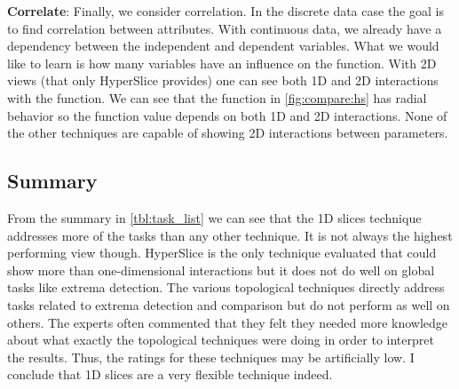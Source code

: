 
\textbf{Correlate}:\label{correlate}
Finally, we consider correlation. In the discrete data case the goal is to find
correlation between attributes. With continuous data, we already have a
dependency between the independent and dependent variables. What we would like
to learn is how many variables have an influence on the function. With 2D views
(that only HyperSlice provides) one can see both 1D and 2D interactions with
the function. We can see that the function in \autoref{fig:compare:hs} has
radial behavior so the function value depends on both 1D and 2D interactions.
None of the other techniques are capable of showing 2D interactions between
parameters.

\subsection{Summary}

From the summary in \autoref{tbl:task_list} we can see that the 1D slices
technique addresses more of the tasks than any other technique.  It is not
always the highest performing view though.  HyperSlice is the only technique 
evaluated that could show more than one-dimensional interactions but it does
not do well on global tasks like extrema detection. The various topological
techniques directly address tasks related to extrema detection and comparison
but do not perform as well on others. 
The experts often commented that they felt they needed more knowledge about
what exactly the topological techniques were doing in order to interpret
the results. Thus, the ratings for these techniques may be artificially low.
I conclude that 1D slices are a
very flexible technique indeed.  

